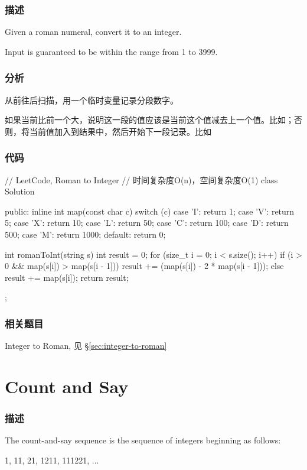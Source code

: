\subsubsection{描述}
Given a roman numeral, convert it to an integer.

Input is guaranteed to be within the range from 1 to 3999.


\subsubsection{分析}
从前往后扫描，用一个临时变量记录分段数字。

如果当前比前一个大，说明这一段的值应该是当前这个值减去上一个值。比如；否则，将当前值加入到结果中，然后开始下一段记录。比如


\subsubsection{代码}
\begin{Code}
// LeetCode, Roman to Integer
// 时间复杂度O(n)，空间复杂度O(1)
class Solution {
public:
    inline int map(const char c) {
        switch (c) {
        case 'I': return 1;
        case 'V': return 5;
        case 'X': return 10;
        case 'L': return 50;
        case 'C': return 100;
        case 'D': return 500;
        case 'M': return 1000;
        default: return 0;
        }
    }

    int romanToInt(string s) {
        int result = 0;
        for (size_t i = 0; i < s.size(); i++) {
            if (i > 0 && map(s[i]) > map(s[i - 1])) {
                result += (map(s[i]) - 2 * map(s[i - 1]));
            } else {
                result += map(s[i]);
            }
        }
        return result;
    }
};
\end{Code}


\subsubsection{相关题目}
\begindot
\item Integer to Roman, 见 \S \ref{sec:integer-to-roman}
\myenddot


\section{Count and Say} %
\label{sec:count-and-say}


\subsubsection{描述}
The count-and-say sequence is the sequence of integers beginning as follows:
\begin{Code}
1, 11, 21, 1211, 111221, ...
\end{Code}

